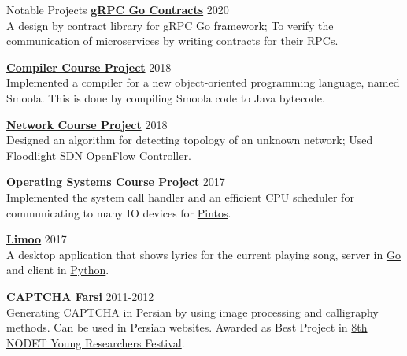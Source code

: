 \documentclass{resume} %
\begin{document}
\begin{rSection}{Notable Projects}
    {\bf \href{https://github.com/shayanh/grpc-go-contracts}{gRPC Go Contracts}} \hfill 2020
    \\A design by contract library for gRPC Go framework; To verify the communication of microservices by writing contracts for their RPCs.

	{\bf \href{https://github.com/shayanh/Smoola}{Compiler Course Project}} \hfill 2018
	\\Implemented a compiler for a new object-oriented programming language, named Smoola. This is done by compiling Smoola code to Java bytecode.
	
	{\bf \href{https://github.com/shayanh/floodlight-sara-protocol}{Network Course Project}} \hfill 2018
	\\Designed an algorithm for detecting topology of an unknown network; Used \href{https://github.com/floodlight/floodlight}{Floodlight} SDN OpenFlow Controller.

	{\bf \href{https://github.com/shayanh/pintos}{Operating Systems Course Project}} \hfill 2017
	\\Implemented the system call handler and an efficient CPU scheduler for communicating to many IO devices for \href{https://en.wikipedia.org/wiki/Pintos}{Pintos}.

	{\bf \href{https://github.com/shayanh/limoo}{Limoo}} \hfill 2017
	\\A desktop application that shows lyrics for the current playing song, server in \href{https://github.com/shayanh/limoo-server}{Go} and client in \href{https://github.com/shayanh/limoo}{Python}.

	{\bf \href{https://github.com/KhassTeam/Persian-CAPTCHA}{CAPTCHA Farsi}} \hfill 2011-2012
	\\Generating CAPTCHA in Persian by using image processing and calligraphy methods. Can be used in Persian websites. Awarded as Best Project in
	\href{https://www.helli.ir/portal/content/%D8%AA%D9%82%D8%AF%DB%8C%D8%B1-%D8%A7%D8%B2-%D8%AF%D8%A7%D9%86%D8%B4-%D8%A2%D9%85%D9%88%D8%B2%D8%A7%D9%86-%D8%A8%D8%B1%D8%AA%D8%B1%D9%BE%DA%98%D9%88%D9%87%D8%B4%DA%AF%D8%B1}
		{8th NODET Young Researchers Festival}.
\end{rSection}
\end{document}
